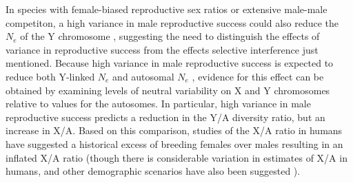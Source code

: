 \documentclass[9pt,twocolumn,twoside]{gsajnl}
\begin{document}
In species with female-biased reproductive sex ratios or extensive male-male competiton, a high variance in male reproductive success could also reduce the $N_{e}$ of the Y chromosome \citep{caballero1995,charlesworth2001,laporte2002,pool2007,ellegren2009}, suggesting the need to distinguish the effects of variance in reproductive success from the effects selective interference just mentioned. Because high variance in male reproductive success is expected to reduce both Y-linked $N_{e}$ and autosomal $N_{e}$ \citep{kimura1964number,nomura2002effective}, evidence for this effect can be obtained by examining levels of neutral variability on X and Y chromosomes relative to values for the autosomes. In particular, high variance in male reproductive success predicts a reduction in the Y/A diversity ratio, but an increase in X/A. Based on this comparison, studies of the X/A ratio in humans have suggested a historical excess of breeding females over males resulting in an inflated X/A ratio (though there is considerable variation in estimates of X/A in humans, and other demographic scenarios have also been suggested \citep{hammer2010,bustamante2009}).


\end{document}
